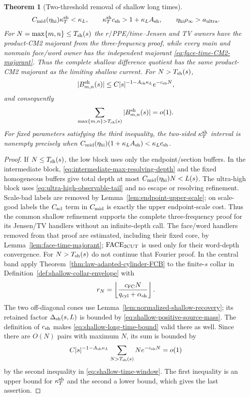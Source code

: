 \documentclass[11pt]{article}
\newtheorem{theorem}{Theorem}[section]
\begin{document}
\begin{theorem}[Two-threshold removal of shallow long times]
\begin{equation}
\label{eq:shallow-time-window}
 C_{\rm mid}(\eta_{\rm hi})\kappa_T^{\rm sh}<\kappa_L,
 \qquad
 \kappa_T^{\rm sh}c_{\rm sh}>1+\kappa_LA_{\rm sh},
 \qquad \eta_{\rm hi}\rho_\infty>a_{\rm ultra}.
\end{equation}
For $N=\max\{m,n\}\le T_{\rm sh}(s)$ the $r/$PPE/time--Jensen and TV
owners have the product-CM2 majorant from the three-frequency proof, while
every main and nonmain face/word owner has the independent majorant
\eqref{eq:face-time-CM2-majorant}.  Thus the complete shallow difference
quotient has the same product-CM2 majorant as the limiting shallow current.
For
$N>T_{\rm sh}(s)$,
\begin{equation}
\label{eq:shallow-long-time-bound}
 |B^{\rm sh}_{m,n}(s)|
 \le C|s|^{-1-A_{\rm sh}\kappa_L}e^{-c_{\rm sh}N},
\end{equation}
and consequently
\begin{equation}
\label{eq:shallow-long-time-sum}
 \sum_{\max\{m,n\}>T_{\rm sh}(s)}
 |B^{\rm sh}_{m,n}(s)|=o(1).
\end{equation}
For fixed parameters satisfying the third inequality, the two-sided
$\kappa_T^{\rm sh}$ interval is nonempty precisely when
$C_{\rm mid}(\eta_{\rm hi})(1+\kappa_LA_{\rm sh})
 <\kappa_Lc_{\rm sh}$.
\end{theorem}

\begin{proof}
If $N\le T_{\rm sh}(s)$, the low block uses only the endpoint/section
buffers.  In the intermediate block, \eqref{eq:intermediate-max-resolving-depth}
and the fixed homogeneous buffers give total depth at most
$C_{\rm mid}(\eta_{\rm hi})N<L(s)$.  The ultra-high block uses
\eqref{eq:ultra-high-observable-tail} and no escape or resolving refinement.
Scale-bad labels are removed by Lemma~\ref{lem:endpoint-upper-scale}; on
scale-good labels the $C_{\rm scl}$ term in $C_{\rm mid}$ is exactly the
upper endpoint-scale cost.  Thus the common shallow refinement supports the
complete three-frequency proof for its Jensen/TV handlers without an
infinite-depth call.  The face/word handlers removed from that proof are
estimated, including their fixed core, by
Lemma~\ref{lem:face-time-majorant}; $\mathrm{FACE}_{\rm 2CUT}$ is used only
for their word-depth convergence.  For $N>T_{\rm sh}(s)$ do not continue
that Fourier proof.  In the central band apply
Theorem~\ref{thm:law-adapted-cylinder-FCB} to the finite-$s$ collar in
Definition~\ref{def:shallow-collar-envelope} with
\[
 r_N=\left\lfloor\frac{c_{\rm FC}N}
 {q_{\rm cyl}+\alpha_{\rm sh}}\right\rfloor .
\]
The two off-diagonal cones use
Lemma~\ref{lem:normalized-shallow-recovery}; its retained factor
$\Delta_{\rm sh}(s,L)$ is bounded by
\eqref{eq:shallow-positive-source-mass}.  The definition of $c_{\rm sh}$ makes
\eqref{eq:shallow-long-time-bound} valid there as well.  Since there are $O(N)$ pairs
with maximum $N$, its sum is bounded by
\[
 C|s|^{-1-A_{\rm sh}\kappa_L}
 \sum_{N>T_{\rm sh}(s)}Ne^{-c_{\rm sh}N}=o(1)
\]
by the second inequality in \eqref{eq:shallow-time-window}.  The first
inequality is an upper bound for $\kappa_T^{\rm sh}$ and the second a lower
bound, which gives the last assertion.
\end{proof}
\end{document}
